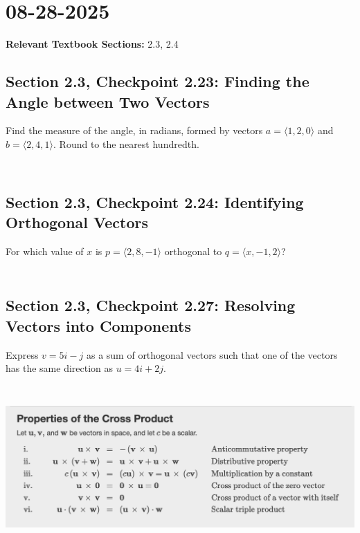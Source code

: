 \documentclass[]{mangos-musings}
\begin{document}
\newpage
\section{08-28-2025}
\textbf{Relevant Textbook Sections:} 2.3, 2.4

\subsection{Section 2.3, Checkpoint 2.23: Finding the Angle between Two Vectors}
Find the measure of the angle, in radians, formed by vectors $a=\langle1,2,0\rangle$ and $b=\langle2,4,1\rangle$. Round to the nearest hundredth.
\begin{align*}
  \\ 
  \\ 
  \\ 
  \\
\end{align*}

\subsection{Section 2.3, Checkpoint 2.24: Identifying Orthogonal Vectors}
For which value of $x$ is $p=\langle2,8,-1\rangle$ orthogonal to $q=\langle x,-1,2\rangle$?
\begin{align*}
  \\ 
  \\ 
  \\
\end{align*}

\subsection{Section 2.3, Checkpoint 2.27: Resolving Vectors into Components}
Express $v=5i-j$ as a sum of orthogonal vectors such that one of the vectors has the same direction as $u=4i+2j$.
\begin{align*}
  \\ 
  \\
  \\
  \\
\end{align*}

\includegraphics[scale=0.6]{assets/rec02-crossprod-properties.png}
\end{document}
